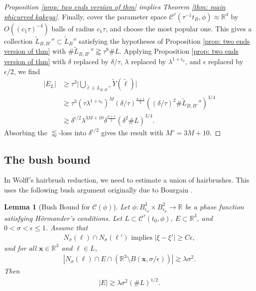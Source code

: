\documentclass[12pt]{amsart}
\newcommand{\x}{{\bf{x}}}
\numberwithin{equation}{section}
\newtheorem{lemma}{Lemma}[section]
\newcommand{\R}{\mathbb{R}}
\newcommand{\1}{\mathbbm{1}}
\renewcommand{\x}{\mathbf x}
\newcommand{\Bphi}{B_{\epsilon_\phi}}
\begin{document}
\begin{proof}[Proposition \ref{prop: two ends version of thm} implies Theorem \ref{thm: main phicurved kakeya}]
    Finally, cover the parameter space $\mathcal C^\tau(\tau^{-1}t_B, \phi) \approx \R^4$ by $O((c_1 \tau)^{-4})$ balls of radius $c_1 \tau$, and choose the most popular one. This gives a collection
    $\tilde L_{B,B'}'' \subset \tilde  L_B''$ satisfying the hypotheses of Proposition \ref{prop: two ends version of thm} with $\# \tilde L_{B,B'}'' \gtrapprox\tau^{9} \# L$. 
    Applying Proposition \ref{prop: two ends version of thm} with $\delta$ replaced by $\delta / \tau$, $\lambda$ replaced by $\lambda^{1 + \epsilon_0}$, and $\epsilon$ replaced by $\epsilon/2$, we find 
    \begin{align}
        |E_L| &\geq 
        \tau^3 \Big |\bigcup_{\tilde \ell \in L_{B,B'}''} \tilde Y(\tilde \ell)\Big | \\
        &\gtrsim \tau^3 (\tau \lambda^{1 + \epsilon_0})^M (\delta / \tau)^{\frac{a + 1}{2}} ((\delta / \tau)^2 \# \tilde L_{B,B'}'')^{3/4} \\
        &\gtrsim \delta^{\epsilon/2} \lambda^{3M+10} \delta^{\frac{a + 1}{2}} (\delta^2 \# L)^{3/4}.
    \end{align}
    Absorbing the $\lessapprox$-loss into $\delta^{\epsilon/2}$ gives the result with $M'=3M+10$. 
\end{proof}

\subsection{The bush bound}

In Wolff's hairbrush reduction, we need to estimate a union of hairbrushes. This uses the following bush argument originally due to Bourgain \cite{BourgainBesicovitch}.

\begin{lemma}[Bush Bound for $\mathcal C(\phi)$]\label{lem: bush bound}
    Let $\phi: \Bphi^3 \times \Bphi^2 \to \R$ be a phase function satisfying H\"ormander's conditions. Let $L \subset \mathcal C^\tau(t_0, \phi)$, $E \subset \R^3$, and $0 < \sigma < \epsilon \leq 1$. Assume that 
    \begin{align}
        N_\sigma(\ell) \cap N_\sigma(\ell') \text{ implies } |\xi - \xi'| \geq C \epsilon,
    \end{align}
    and for all $\x \in \R^3$ and $\ell \in L$, 
    \begin{align}
        |N_\sigma(\ell) \cap E \cap (\R^3 \setminus B(\x, \sigma / \epsilon))| \gtrsim \lambda \sigma^2. 
    \end{align}
    Then 
    \begin{align}
        |E| \gtrsim \lambda \sigma^2 (\# L)^{1/2}. 
    \end{align}
\end{lemma}
\end{document}
